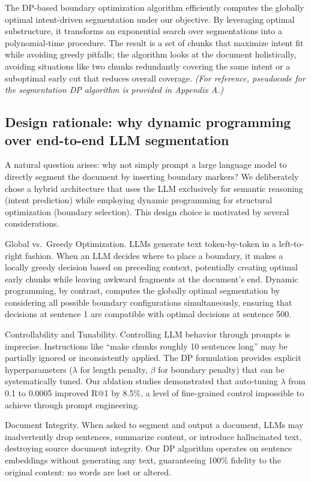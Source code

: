 \documentclass[12pt,a4paper]{report}
\begin{document}
The DP-based boundary optimization algorithm efficiently computes the globally optimal intent-driven segmentation under our objective. By leveraging optimal substructure, it transforms an exponential search over segmentations into a polynomial-time procedure. The result is a set of chunks that maximize intent fit while avoiding greedy pitfalls; the algorithm looks at the document holistically, avoiding situations like two chunks redundantly covering the same intent or a suboptimal early cut that reduces overall coverage. \textit{(For reference, pseudocode for the segmentation DP algorithm is provided in Appendix A.)}

\subsection{Design rationale: why dynamic programming over end-to-end LLM segmentation}

A natural question arises: why not simply prompt a large language model to directly segment the document by inserting boundary markers? We deliberately chose a hybrid architecture that uses the LLM exclusively for semantic reasoning (intent prediction) while employing dynamic programming for structural optimization (boundary selection). This design choice is motivated by several considerations.

Global vs.\ Greedy Optimization. LLMs generate text token-by-token in a left-to-right fashion. When an LLM decides where to place a boundary, it makes a locally greedy decision based on preceding context, potentially creating optimal early chunks while leaving awkward fragments at the document's end. Dynamic programming, by contrast, computes the globally optimal segmentation by considering all possible boundary configurations simultaneously, ensuring that decisions at sentence 1 are compatible with optimal decisions at sentence 500.

Controllability and Tunability. Controlling LLM behavior through prompts is imprecise. Instructions like ``make chunks roughly 10 sentences long'' may be partially ignored or inconsistently applied. The DP formulation provides explicit hyperparameters ($\lambda$ for length penalty, $\beta$ for boundary penalty) that can be systematically tuned. Our ablation studies demonstrated that auto-tuning $\lambda$ from 0.1 to 0.0005 improved R@1 by 8.5\%, a level of fine-grained control impossible to achieve through prompt engineering.

Document Integrity. When asked to segment and output a document, LLMs may inadvertently drop sentences, summarize content, or introduce hallucinated text, destroying source document integrity. Our DP algorithm operates on sentence embeddings without generating any text, guaranteeing 100\% fidelity to the original content: no words are lost or altered.
\end{document}
